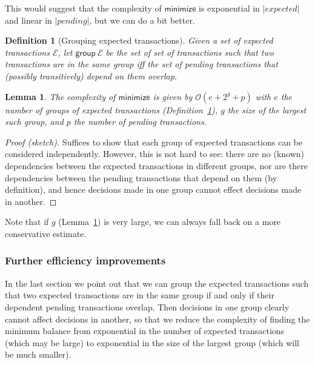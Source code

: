 \documentclass{article}
\newcommand{\order}[1]{\mathcal{O}\left(#1\right)}
\newtheorem{lemma}{Lemma}
\newtheorem{definition}{Definition}
\begin{document}
This would suggest that the complexity of $\mathsf{minimize}$ is
exponential in $|\mathit{expected}|$ and linear in $|\mathit{pending}|$,
but we can do a bit better.

\begin{definition}[Grouping expected transactions]
Given a set of expected transactions $\mathcal{E}$, let
$\mathsf{group} ~ \mathcal{E}$ be the set of set of transactions such that
two transactions are in the same group iff the set of pending transactions
that (possibly transitively) depend on them overlap.
\label{def:group_expected}
\end{definition}

\begin{lemma}
The complexity of $\mathsf{minimize}$ is given by
\begin{math}
\order{e + 2^g + p}
\end{math}
with $e$ the number of groups of expected transactions
(Definition~\ref{def:group_expected}), $g$ the size of the largest such group,
and $p$ the number of pending transactions.
\label{lem:complexity_minimize}
\end{lemma}

\begin{proof}[Proof (sketch)]
Suffices to show that each group of expected transactions can be considered
independently. However, this is not hard to see: there are no (known)
dependencies between the expected transactions in different groups, nor are
there dependencies between the pending transactions that depend on them (by
definition), and hence decisions made in one group cannot effect decisions made
in another.
\end{proof}

Note that if $g$ (Lemma~\ref{lem:complexity_minimize}) is very large, we can
always fall back on a more conservative estimate.

\subsubsection{Further efficiency improvements}

In the last section we point out that we can group the expected transactions
such that two expected transactions are in the same group if and only if
their dependent pending transactions overlap. Then decisions in one group
clearly cannot affect decisions in another, so that we reduce the complexity
of finding the minimum balance from exponential in the number of expected
transactions (which may be large) to exponential in the size of the largest
group (which will be much smaller).
\end{document}
